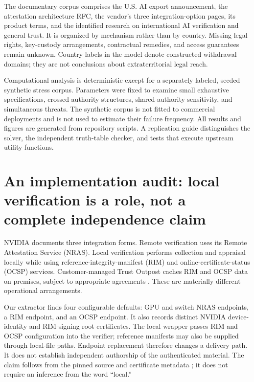 \documentclass[11pt,letterpaper]{article}
\begin{document}
The documentary corpus comprises the U.S. AI export announcement, the attestation architecture RFC, the vendor's three integration-option pages, its product terms, and the identified research on international AI verification and general trust. It is organized by mechanism rather than by country. Missing legal rights, key-custody arrangements, contractual remedies, and access guarantees remain unknown. Country labels in the model denote constructed withdrawal domains; they are not conclusions about extraterritorial legal reach.

Computational analysis is deterministic except for a separately labeled, seeded synthetic stress corpus. Parameters were fixed to examine small exhaustive specifications, crossed authority structures, shared-authority sensitivity, and simultaneous threats. The synthetic corpus is not fitted to commercial deployments and is not used to estimate their failure frequency. All results and figures are generated from repository scripts. A replication guide distinguishes the solver, the independent truth-table checker, and tests that execute upstream utility functions.

\section{An implementation audit: local verification is a role, not a complete independence claim}
NVIDIA documents three integration forms. Remote verification uses its Remote Attestation Service (NRAS). Local verification performs collection and appraisal locally while using reference-integrity-manifest (RIM) and online-certificate-status (OCSP) services. Customer-managed Trust Outpost caches RIM and OCSP data on premises, subject to appropriate agreements \citep{nremote,nlocal,noutpost}. These are materially different operational arrangements.

Our extractor finds four configurable defaults: GPU and switch NRAS endpoints, a RIM endpoint, and an OCSP endpoint. It also records distinct NVIDIA device-identity and RIM-signing root certificates. The local wrapper passes RIM and OCSP configuration into the verifier; reference manifests may also be supplied through local-file paths. Endpoint replacement therefore changes a delivery path. It does not establish independent authorship of the authenticated material. The claim follows from the pinned source and certificate metadata \citep{nvtrust}; it does not require an inference from the word ``local.''
\end{document}
